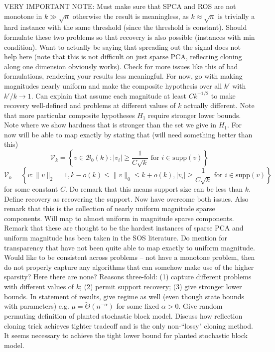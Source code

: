 \documentclass[11pt]{article}
\begin{document}
VERY IMPORTANT NOTE: Must make sure that SPCA and ROS are not monotone in $k \gg \sqrt{n}$ otherwise the result is meaningless, as $k \approx \sqrt{n}$ is trivially a hard instance with the same threshold (since the threshold is constant). Should formulate these two problems so that recovery is also possible (instances with min condition). Want to actually be saying that spreading out the signal does not help here (note that this is not difficult on just sparse PCA, reflecting cloning along one dimension obviously works). Check for more issues like this of bad formulations, rendering your results less meaningful. For now, go with making magnitudes nearly uniform and make the composite hypothesis over all $k'$ with $k'/k \to 1$. Can explain that assume each magnitude at least $Ck^{-1/2}$ to make recovery well-defined and problems at different values of $k$ actually different. Note that more particular composite hypotheses $H_1$ require stronger lower bounds. Note where we show hardness that is stronger than the set we give in $H_1$. For now will be able to map exactly by stating that (will need something better than this)
$$\mathcal{V}_k = \left\{ v \in \mathcal{B}_0(k) : |v_i| \ge \frac{1}{C\sqrt{k}} \text{ for } i \in \text{supp}(v) \right\}$$
$$\mathcal{V}_k = \left\{ v  : \| v\|_2 = 1, k - o(k) \le \| v \|_0 \le k + o(k), |v_i| \ge \frac{1}{C\sqrt{k}} \text{ for } i \in \text{supp}(v) \right\}$$
for some constant $C$. Do remark that this means support size can be less than $k$. Define recovery as recovering the support. Now have overcome both issues. Also remark that this is the collection of nearly uniform magnitude sparse components. Will map to almost uniform in magnitude sparse components. Remark that these are thought to be the hardest instances of sparse PCA and uniform magnitude has been taken in the SOS literature. Do mention for transparency that have not been quite able to map exactly to uniform magnitude. Would like to be consistent across problems -- not have a monotone problem, then do not properly capture any algorithms that can somehow make use of the higher sparsity? Here there are none? Reasons three-fold: (1) capture different problems with different values of $k$; (2) permit support recovery; (3) give stronger lower bounds. In statement of results, give regime as well (even though state bounds with parameters) e.g. $\mu = \tilde{\Theta}(n^{-\alpha})$ for some fixed $\alpha > 0$. Give random permuting definition of planted stochastic block model. Discuss how reflection cloning trick achieves tighter tradeoff and is the only non-``lossy" cloning method. It seems necessary to achieve the tight lower bound for planted stochastic block model.
\end{document}
